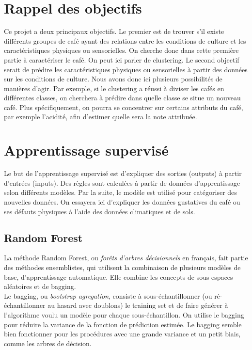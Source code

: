 \section{Rappel des objectifs}\label{obj}
Ce projet a deux principaux objectifs. Le premier est de trouver s'il existe différents groupes de café ayant des relations entre les conditions de culture et les caractéristiques physiques ou sensorielles. On cherche donc dans cette première partie à caractériser le café. On peut ici parler de clustering.  Le second objectif serait de prédire les caractéristiques physiques ou sensorielles à partir des données sur les conditions de culture. Nous avons donc ici plusieurs possibilités de manières d'agir. Par exemple, si le clustering a réussi à diviser les cafés en différentes classes, on cherchera à prédire dans quelle classe se situe un nouveau café. Plus spécifiquement, on pourra se concentrer sur certains attributs du café, par exemple l'acidité, afin d'estimer quelle sera la note attribuée. 



\newpage

\section{Apprentissage supervisé}
Le but de l'apprentissage supervisé est d'expliquer des sorties (outputs) à partir d'entrées (inputs). Des règles sont calculées à partir de données d'apprentissage selon différents modèles. Par la suite, le modèle est utilisé pour catégoriser des nouvelles données. On essayera ici d'expliquer les données gustatives du café ou ses défauts physiques à l'aide des données climatiques et de sols. 


\subsection{Random Forest}

La méthode Random Forest, ou \textit{forêts d'arbres décisionnels} en français, fait partie des méthodes ensemblistes\cite{EnsembleMethods}, qui utilisent la combinaison de plusieurs modèles de base, d'apprentissage automatique. Elle combine les concepts de sous-espaces aléatoires et de bagging.\\

Le bagging\label{bagging}, ou \textit{bootstrap agregation}, consiste à sous-échantillonner (ou ré-échantillonner au hasard avec doublons) le training set et de faire générer à l’algorithme voulu un modèle pour chaque sous-échantillon. On utilise le bagging pour réduire la variance de la fonction de prédiction estimée. Le bagging semble bien fonctionner pour les procédures avec une grande variance et un petit biais, comme les arbres de décision. \cite{hastie_09_elements-of.statistical-learning}\\


